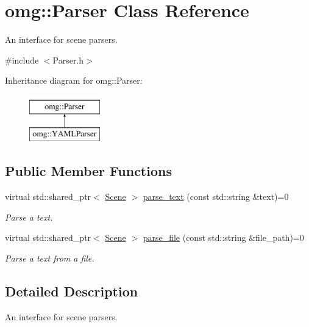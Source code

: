 \hypertarget{classomg_1_1_parser}{}\section{omg\+::Parser Class Reference}
\label{classomg_1_1_parser}


An interface for scene parsers.  




{\ttfamily \#include $<$Parser.\+h$>$}

Inheritance diagram for omg\+::Parser\+:\begin{figure}[H]
\begin{center}
\leavevmode
\includegraphics[height=2.000000cm]{classomg_1_1_parser}
\end{center}
\end{figure}
\subsection*{Public Member Functions}
\begin{DoxyCompactItemize}
\item 
virtual std\+::shared\+\_\+ptr$<$ \mbox{\hyperlink{classomg_1_1_scene}{Scene}} $>$ \mbox{\hyperlink{classomg_1_1_parser_a50199f934cb3471777cb859a7289739f}{parse\+\_\+text}} (const std\+::string \&text)=0
\begin{DoxyCompactList}\small\item\em Parse a text. \end{DoxyCompactList}\item 
virtual std\+::shared\+\_\+ptr$<$ \mbox{\hyperlink{classomg_1_1_scene}{Scene}} $>$ \mbox{\hyperlink{classomg_1_1_parser_a327a60ea0092d0b969a3ec393248ca8f}{parse\+\_\+file}} (const std\+::string \&file\+\_\+path)=0
\begin{DoxyCompactList}\small\item\em Parse a text from a file. \end{DoxyCompactList}\end{DoxyCompactItemize}


\subsection{Detailed Description}
An interface for scene parsers. 

